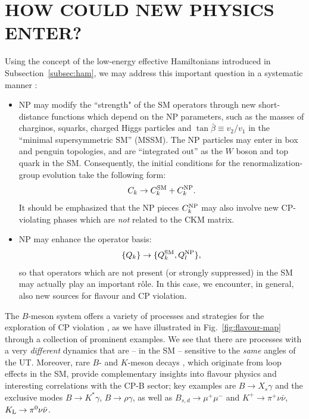 \documentclass[11pt]{cernrep}
\begin{document}
\section{HOW COULD NEW PHYSICS ENTER?}\label{sec:NP}
\setcounter{equation}{0}
%
%
%
Using the concept of the low-energy effective Hamiltonians introduced
in Subsection~\ref{subsec:ham}, we may address this important question
in a systematic manner \cite{buras-NP}:
\begin{itemize}
\item NP may modify the ``strength" of the SM operators through new
short-distance functions which depend on the NP parameters, such as the masses 
of charginos, squarks, charged Higgs particles and $\tan\bar\beta\equiv v_2/v_1$ 
in the ``minimal supersymmetric SM'' (MSSM). The NP particles may enter in 
box and penguin topologies, and are ``integrated out'' as the $W$ boson and 
top quark in the SM. Consequently, the initial conditions for the
renormalization-group evolution take the following form:
\begin{equation}\label{WC-NP}
C_k \to C_k^{\rm SM} + C_k^{\rm NP}.
\end{equation}
It should be emphasized that the NP pieces $C_k^{\rm NP}$ may also involve 
new CP-violating phases which are {\it not} related to the CKM matrix.
\item NP may enhance the operator basis:
\begin{equation}
\{Q_k\} \to \{Q_k^{\rm SM}, Q_l^{\rm NP}\},
\end{equation}
so that operators which are not present (or strongly suppressed) in the 
SM may actually play an important r\^ole. In this case, we encounter, 
in general, also new sources for flavour and CP violation.
\end{itemize}
The $B$-meson system offers a variety of processes and strategies for the
exploration of CP violation \cite{CKM-book,RF-Phys-Rep}, as we have illustrated in 
Fig.~\ref{fig:flavour-map} through a collection of prominent examples. 
We see that there are processes with a very {\it different} dynamics that 
are -- in the SM -- sensitive to the {\it same} angles of the UT. 
Moreover, rare $B$- and $K$-meson decays \cite{rare}, 
which originate from loop effects in the SM, provide complementary insights 
into flavour physics and interesting correlations with the CP-B sector; key 
examples are $B\to X_s\gamma$ and the exclusive modes
$B\to K^\ast \gamma$, $B\to\rho\gamma$, as well as $B_{s,d}\to \mu^+\mu^-$ 
and $K^+\to\pi^+\nu\bar\nu$, $K_{\rm L}\to\pi^0\nu\bar\nu$. 
\end{document}

